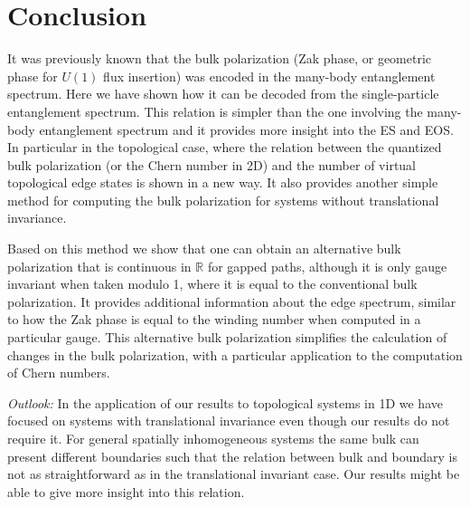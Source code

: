 \documentclass[twocolumn,amsmath,longbibliography,amssymb,superscriptaddress]{revtex4-1}
\newcommand{\tpo}{\tilde{\mathcal{P}}_{\rm o}}
\begin{document}
%
%
%




\section{Conclusion}

It was previously known that the bulk polarization (Zak phase, or geometric phase for $U(1)$ flux insertion) was encoded in the many-body entanglement spectrum. Here we have shown how it can be decoded from the single-particle entanglement spectrum. This relation is simpler than the one involving the many-body entanglement spectrum and it provides more insight into the ES and EOS. In particular in the topological case, where the relation between the quantized bulk polarization (or the Chern number in 2D) and the number of virtual topological edge states is shown in a new way. It also provides another simple method for computing the bulk polarization for systems without translational invariance. 

Based on this method we show that one can obtain an alternative bulk polarization that is continuous in $\mathbb{R}$ for gapped paths, although it is only gauge invariant when taken modulo 1, where it is equal to the conventional bulk polarization. It provides additional information about the edge spectrum, similar to how the Zak phase is equal to the winding number when computed in a particular gauge. This alternative bulk polarization simplifies the calculation of changes in the bulk polarization, with a particular application to the computation of Chern numbers.

\emph{Outlook:} In the application of our results to topological systems in 1D we have focused on systems with translational invariance even though our results do not require it. For general spatially inhomogeneous systems the same bulk can present different boundaries such that the relation between bulk and boundary is not as straightforward as in the translational invariant case. Our results might be able to give more insight into this relation. 
\end{document}

